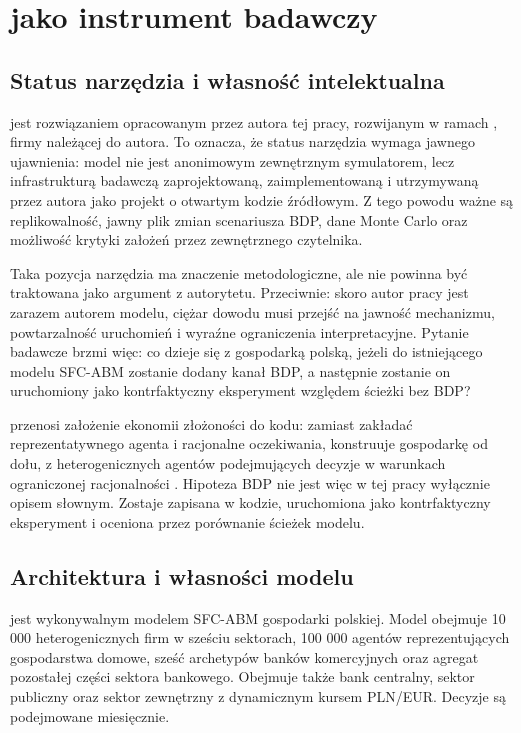 \section{\amor{} jako instrument badawczy}

\subsection{Status narzędzia i własność intelektualna}

\amor{} jest rozwiązaniem opracowanym przez autora tej pracy, rozwijanym w ramach \bbg{}, firmy należącej do autora. To oznacza, że status narzędzia wymaga jawnego ujawnienia: model nie jest anonimowym zewnętrznym symulatorem, lecz infrastrukturą badawczą zaprojektowaną, zaimplementowaną i utrzymywaną przez autora jako projekt o otwartym kodzie źródłowym. Z tego powodu ważne są replikowalność, jawny plik zmian scenariusza BDP, dane Monte Carlo oraz możliwość krytyki założeń przez zewnętrznego czytelnika.

Taka pozycja narzędzia ma znaczenie metodologiczne, ale nie powinna być traktowana jako argument z autorytetu. Przeciwnie: skoro autor pracy jest zarazem autorem modelu, ciężar dowodu musi przejść na jawność mechanizmu, powtarzalność uruchomień i wyraźne ograniczenia interpretacyjne. Pytanie badawcze brzmi więc: co dzieje się z gospodarką polską, jeżeli do istniejącego modelu SFC-ABM zostanie dodany kanał BDP, a następnie zostanie on uruchomiony jako kontrfaktyczny eksperyment względem ścieżki bez BDP?

\amor{} przenosi założenie ekonomii złożoności do kodu: zamiast zakładać reprezentatywnego agenta i racjonalne oczekiwania, konstruuje gospodarkę od dołu, z heterogenicznych agentów podejmujących decyzje w warunkach ograniczonej racjonalności \parencite{arthur2021}. Hipoteza BDP nie jest więc w tej pracy wyłącznie opisem słownym. Zostaje zapisana w kodzie, uruchomiona jako kontrfaktyczny eksperyment i oceniona przez porównanie ścieżek modelu.

\subsection{Architektura i własności modelu}

\amor{} jest wykonywalnym modelem SFC-ABM gospodarki polskiej. Model obejmuje 10 000 heterogenicznych firm w sześciu sektorach, 100 000 agentów reprezentujących gospodarstwa domowe, sześć archetypów banków komercyjnych oraz agregat pozostałej części sektora bankowego. Obejmuje także bank centralny, sektor publiczny oraz sektor zewnętrzny z dynamicznym kursem PLN/EUR. Decyzje są podejmowane miesięcznie.


